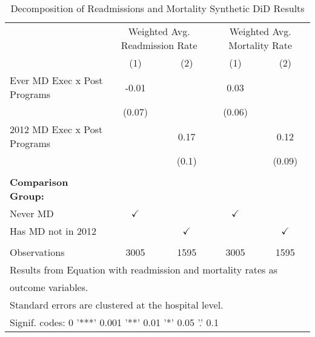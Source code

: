 \begin{table}[ht!]

\caption{\label{tab:MD_noMD_readmort_decomp_synth}Decomposition of Readmissions and Mortality Synthetic DiD Results}
\centering
\begin{tabular}[t]{lcccc}
\toprule
\multicolumn{1}{c}{ } & \multicolumn{2}{c}{Weighted Avg. Readmission Rate} & \multicolumn{2}{c}{Weighted Avg. Mortality Rate} \\
 & (1) & (2) & (1) & (2)\\
\midrule
Ever MD Exec x Post Programs & -0.01 &  & 0.03 & \\
 & (0.07) &  & (0.06) & \\
2012 MD Exec x Post Programs &  & 0.17 &  & 0.12\\
 &  & (0.1) &  & (0.09)\\
 &  &  &  & \\
\addlinespace
\textbf{Comparison Group:} &  &  &  & \\
Never MD & $\checkmark$ &  & $\checkmark$ & \\
Has MD not in 2012 &  & $\checkmark$ &  & $\checkmark$\\
 &  &  &  & \\
Observations & 3005 & 1595 & 3005 & 1595\\
\bottomrule
\multicolumn{5}{l}{\textsuperscript{} Results from Equation with readmission and mortality rates as}\\
\multicolumn{5}{l}{outcome variables.}\\
\multicolumn{5}{l}{\textsuperscript{} Standard errors are clustered at the hospital level.}\\
\multicolumn{5}{l}{\textsuperscript{} Signif. codes: 0 '***' 0.001 '**' 0.01 '*' 0.05 '.' 0.1}\\
\end{tabular}
\end{table}
